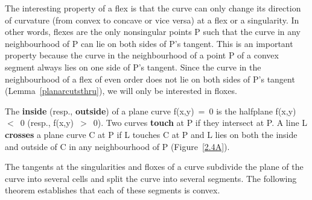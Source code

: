 The interesting property of a flex is that the curve can only change its
direction of curvature (from convex to concave or vice versa) at a
flex or a singularity.
In other words, flexes are the only
nonsingular points P such that the curve in any neighbourhood of P can
lie on both sides of P's tangent.
This is an important property because the curve in the neighbourhood
of a point P of a convex segment always lies on one side of P's tangent.
Since the curve in the neighbourhood of a flex of even
order does not lie on both sides of P's tangent 
(Lemma~\ref{planarcutsthru}), we will only be interested in floxes.

%
\begin{definition}
\label{defn-cross}
The {\bf inside} (resp., {\bf outside}) of a plane curve \mbox{f(x,y) = 0}
is the halfplane \mbox{f(x,y) $<$ 0} (resp., \mbox{f(x,y) $>$ 0}).
Two curves {\bf touch} at P if they intersect at P.
A line L {\bf crosses} a plane curve C at P if L touches C at P and L 
lies on both the inside
and outside of C in any neighbourhood of P (Figure~\ref{2.4A}).
\end{definition}
%

The tangents at the singularities and floxes of a curve subdivide the plane
of the curve into several cells and split the curve into several segments.
The following theorem establishes that each of these segments is convex.
%

